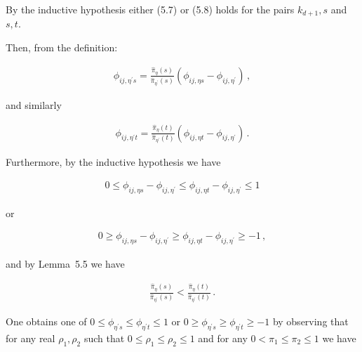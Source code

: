 By the inductive hypothesis either (5.7) or (5.8) holds for the pairs $k_{d+1},s$ and $s,t$.\par




Then, from the definition:\par


\[\begin{gathered}
\displaystyle\phi_{ij,\eta^{\prime}s} \displaystyle=\frac{\hat{\pi}_{\eta}(s)}{\hat{\pi}_{\eta^{\prime}}(s)}(\phi_{ij,\eta s}-\phi_{ij,\eta^{\prime}})\,,
\end{gathered}\]


and similarly\par


\[\begin{gathered}
\displaystyle\phi_{ij,\eta^{\prime}t} \displaystyle=\frac{\hat{\pi}_{\eta}(t)}{\hat{\pi}_{\eta^{\prime}}(t)}(\phi_{ij,\eta t}-\phi_{ij,\eta^{\prime}})\,.
\end{gathered}\]




Furthermore, by the inductive hypothesis we have\par


\[\begin{gathered}
\displaystyle 0\leq\phi_{ij,\eta s}-\phi_{ij,\eta^{\prime}}\leq\phi_{ij,\eta t}-\phi_{ij,\eta^{\prime}}\leq 1
\end{gathered}\]


or\par


\[\begin{gathered}
\displaystyle 0\geq\phi_{ij,\eta s}-\phi_{ij,\eta^{\prime}}\geq\phi_{ij,\eta t}-\phi_{ij,\eta^{\prime}}\geq-1\,,
\end{gathered}\]


and by Lemma 5.5 we have\par


\[\begin{gathered}
\displaystyle\frac{\hat{\pi}_{\eta}(s)}{\hat{\pi}_{\eta^{\prime}}(s)}<\frac{\hat{\pi}_{\eta}(t)}{\hat{\pi}_{\eta^{\prime}}(t)}\,.
\end{gathered}\]


One obtains one of $0\leq\phi_{\eta^{\prime}s}\leq\phi_{\eta^{\prime}t}\leq 1$ or $0\geq\phi_{\eta^{\prime}s}\geq\phi_{\eta^{\prime}t}\geq-1$ by observing that for any real $\rho_{1},\rho_{2}$ such that $0\leq\rho_{1}\leq\rho_{2}\leq 1$ and for any $0<\pi_{1}\leq\pi_{2}\leq 1$ we have\par




